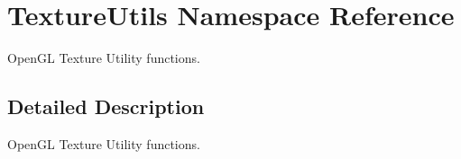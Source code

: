 \hypertarget{namespace_texture_utils}{}\section{Texture\+Utils Namespace Reference}
\label{namespace_texture_utils}


Open\+GL Texture Utility functions.  




\subsection{Detailed Description}
Open\+GL Texture Utility functions. 